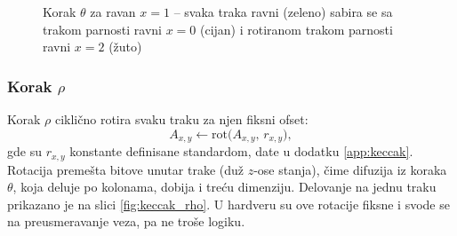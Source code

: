 \begin{figure}[H]
\centering
{}
\caption{Korak $\theta$ za ravan $x=1$ -- svaka traka ravni (zeleno) sabira se sa trakom parnosti ravni $x=0$ (cijan) i rotiranom trakom parnosti ravni $x=2$ (žuto)}
\label{fig:keccak_theta}
\end{figure}

\subsubsection{Korak \texorpdfstring{$\rho$}{rho}}

Korak $\rho$ ciklično rotira svaku traku za njen fiksni ofset:
\begin{equation}
    A_{x,y} \gets \mathrm{rot}\big(A_{x,y},\, r_{x,y}\big),
\end{equation}
gde su $r_{x,y}$ konstante definisane standardom, date u dodatku \ref{app:keccak}. Rotacija premešta bitove unutar trake (duž $z$-ose stanja), čime difuzija iz koraka $\theta$, koja deluje po kolonama, dobija i treću dimenziju. Delovanje na jednu traku prikazano je na slici \ref{fig:keccak_rho}. U hardveru su ove rotacije fiksne i svode se na preusmeravanje veza, pa ne troše logiku.


